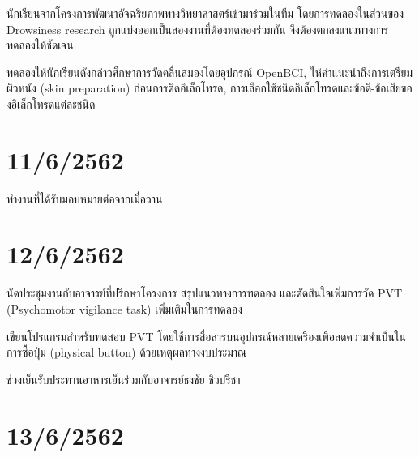 นักเรียนจากโครงการพัฒนาอัจฉริยภาพทางวิทยาศาสตร์เข้ามาร่วมในทีม โดยการทดลองในส่วนของ Drowsiness research
ถูกแบ่งออกเป็นสองงานที่ต้องทดลองร่วมกัน จึงต้องตกลงแนวทางการทดลองให้ชัดเจน

ทดลองให้นักเรียนดังกล่าวศึกษาการวัดคลื่นสมองโดยอุปกรณ์ OpenBCI, ให้คำแนะนำถึงการเตรียมผิวหนัง (skin preparation)
ก่อนการติดอิเล็กโทรด, การเลือกใช้ชนิดอิเล็กโทรดและข้อดี-ข้อเสียของอิเล็กโทรดแต่ละชนิด

\section*{11/6/2562}

ทำงานที่ได้รับมอบหมายต่อจากเมื่อวาน

\section*{12/6/2562}

นัดประชุมงานกับอาจารย์ที่ปรึกษาโครงการ สรุปแนวทางการทดลอง และตัดสินใจเพิ่มการวัด PVT (Psychomotor vigilance task)
เพิ่มเติมในการทดลอง

เขียนโปรแกรมสำหรับทดสอบ PVT โดยใช้การสื่อสารบนอุปกรณ์หลายเครื่องเพื่อลดความจำเป็นในการซื้อปุ่ม (physical button)
ด้วยเหตุผลทางงบประมาณ

ช่วงเย็นรับประทานอาหารเย็นร่วมกับอาจารย์ธงชัย ชิวปรีชา

\section*{13/6/2562}

